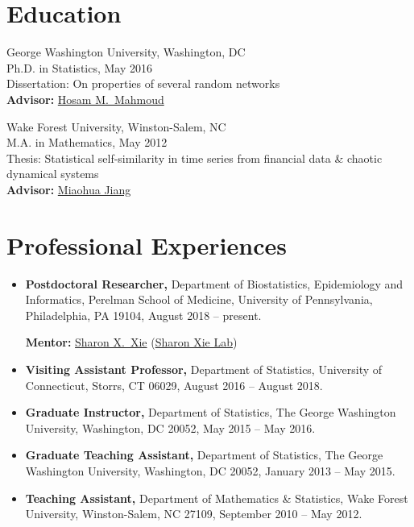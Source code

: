 \documentclass{res}
\begin{document}
\begin{resume} 
	
\section{Education} 
George Washington University, Washington, DC \\
Ph.D. in Statistics, May 2016 \\
Dissertation: On properties of several random networks \\
{\bf Advisor:} 
\href{https://statistics.columbian.gwu.edu/hosam-m-mahmoud}
{Hosam M.\ Mahmoud}

Wake Forest University, Winston-Salem, NC \\
M.A. in Mathematics, May 2012 \\
Thesis: Statistical self-similarity in time series from financial 
data \& chaotic dynamical systems \\
{\bf Advisor:} \href{https://math.wfu.edu/jiang}{Miaohua Jiang}

\section{Professional Experiences}
\begin{itemize}
	\item {\bf Postdoctoral Researcher,} Department of 
	Biostatistics, Epidemiology and Informatics, Perelman School of 
	Medicine, University of Pennsylvania, Philadelphia, PA 19104, 
	August 2018 -- present.
	
	{\bf Mentor:} 
	\href{https://www.med.upenn.edu/apps/faculty/index.php/g275/
		p9964}{Sharon X.\ Xie} 
		(\href{https://sites.google.com/view/sharonxielab/
		home?authuser=0}{Sharon Xie Lab})
	
	\item {\bf Visiting Assistant Professor,} Department of 
	Statistics, University of Connecticut, Storrs, CT 06029, August 
	2016 
	-- August 2018.
	
	\item {\bf Graduate Instructor,} Department of Statistics, The 
	George Washington University, Washington, DC 20052, May 2015 -- 
	May 
	2016.
	
	\item{\bf Graduate Teaching Assistant,} Department of 
	Statistics, The George Washington University, Washington, DC 
	20052, 
	January 2013 -- May 2015.
	
	\item{\bf Teaching Assistant,} Department of Mathematics \& 
	Statistics, Wake Forest University, Winston-Salem, NC 27109, 
	September 
	2010 -- May 2012.
\end{itemize}


\end{resume}
\end{document}
